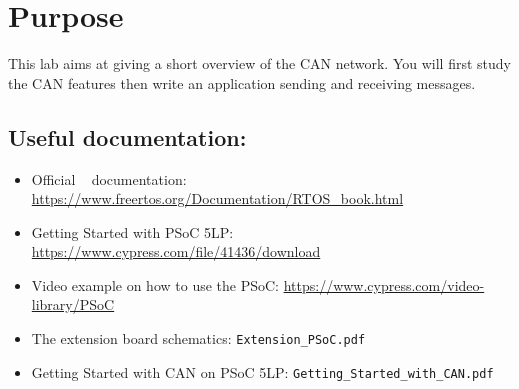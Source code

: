 \section*{Purpose}

This lab aims at giving a short overview of the CAN network. You will first study the CAN features then write an application sending and receiving messages.


\subsection*{Useful documentation:}
\begin{itemize}
    \item Official \rtos~ documentation: \url{https://www.freertos.org/Documentation/RTOS_book.html}
    \item Getting Started with PSoC 5LP: \url{https://www.cypress.com/file/41436/download}
    \item Video example on how to use the PSoC: \url{https://www.cypress.com/video-library/PSoC}
    \item The extension board schematics: \texttt{Extension\_PSoC.pdf}
    \item Getting Started with CAN on PSoC 5LP:
    \texttt{Getting\_Started\_with\_CAN.pdf}
\end{itemize}

